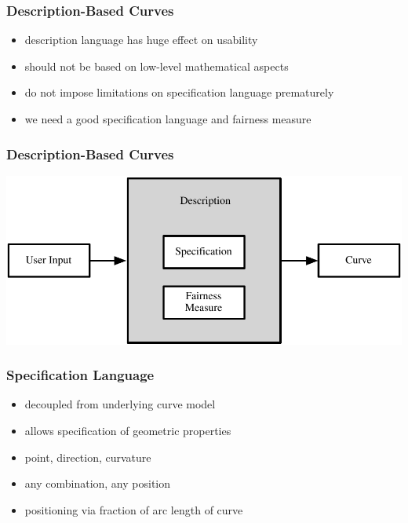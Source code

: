\documentclass[mathserif]{beamer}
\begin{document}
		\begin{frame}
			\frametitle{Description-Based Curves}
			\begin{itemize}
				\item description language has huge effect on usability
				\item should not be based on low-level mathematical aspects %
				\item do not impose limitations on specification language prematurely %
				\item we need a good specification language and fairness measure
			\end{itemize}
		\end{frame}
	
		\begin{frame}
			\frametitle{Description-Based Curves}
			\begin{centering}
				\includegraphics[width=\textwidth]{../resources/description-based_curves.pdf}
			\end{centering}
		\end{frame}
		
		\begin{frame}
			\frametitle{Specification Language}
			\begin{itemize}
				\item decoupled from underlying curve model
				\item allows specification of geometric properties
				\item point, direction, curvature
				\item any combination, any position
				\item positioning via fraction of arc length of curve
			\end{itemize}
		\end{frame}
\end{document}
